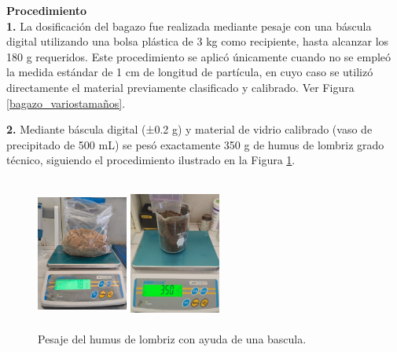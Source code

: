 \documentclass[12pt]{article}
\begin{document}
			
			\textbf{Procedimiento}
			\\[0.5em]
			\textbf{1.}	La dosificación del bagazo fue realizada mediante pesaje con una báscula digital utilizando una bolsa plástica de 3 kg como recipiente, hasta alcanzar los 180 g requeridos. Este procedimiento se aplicó únicamente cuando no se empleó la medida estándar de 1 cm de longitud de partícula, en cuyo caso se utilizó directamente el material previamente clasificado y calibrado. Ver Figura \ref{bagazo_variostamaños}.
		
			
			\textbf{2.}	Mediante báscula digital (±0.2 g) y material de vidrio calibrado (vaso de precipitado de 500 mL) se pesó exactamente 350 g de humus de lombriz grado técnico, siguiendo el procedimiento ilustrado en la Figura \ref{humus}.
			
			
				\begin{figure}[H]
				\centering
				\begin{minipage}{0.46\textwidth}
						\centering
					\includegraphics[width=3cm, height=5cm]{imagenes/pesado2}
					\caption{Medición de masa del bagazo de caña, clasificado por tamaño de partícula (1 mm a 10 cm), previo al proceso de bioetanol.}
					\label{bagazo_variostamaños}
				\end{minipage}
				\hfill
				\begin{minipage}{0.48\textwidth}
				\centering
				\includegraphics[width=3cm, height=5cm]{imagenes/humus}
				\caption{Pesaje del humus de lombriz con ayuda de una bascula.}
				\label{humus}
				\end{minipage}
			\end{figure}
			
\end{document}
